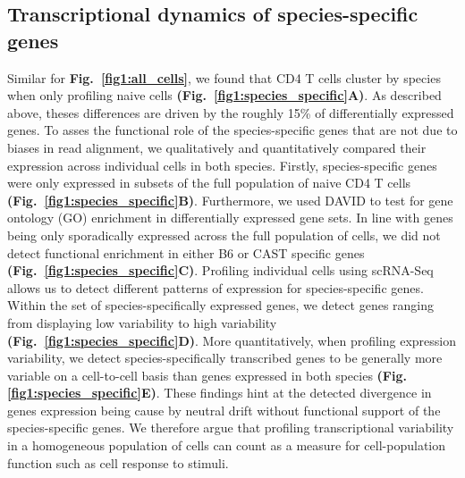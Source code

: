 \subsection{Transcriptional dynamics of species-specific genes}
\label{sec1:species-spec-dynamics}

Similar for \textbf{Fig.~\ref{fig1:all_cells}}, we found that CD4\plus{} T cells cluster by species when only profiling naive cells \textbf{(Fig.~\ref{fig1:species_specific}A)}. As described above, theses differences are driven by the roughly 15\% of differentially expressed genes. To asses the functional role of the species-specific genes that are not due to biases in read alignment, we qualitatively and quantitatively compared their expression across individual cells in both species. Firstly, species-specific genes were only expressed in subsets of the full population of naive CD4\plus{} T cells \textbf{(Fig.~\ref{fig1:species_specific}B)}. Furthermore, we used DAVID \citep{Dennis2003} to test for gene ontology (GO) enrichment in differentially expressed gene sets. In line with genes being only sporadically expressed across the full population of cells, we did not detect functional enrichment in either B6 or CAST specific genes \textbf{(Fig.~\ref{fig1:species_specific}C)}. Profiling individual cells using scRNA-Seq allows us to detect different patterns of expression for species-specific genes. Within the set of species-specifically expressed genes, we detect genes ranging from displaying low variability to high variability \textbf{(Fig.~\ref{fig1:species_specific}D)}. More quantitatively, when profiling expression variability, we detect species-specifically transcribed genes to be generally more variable on a cell-to-cell basis than genes expressed in both species \textbf{(Fig. \ref{fig1:species_specific}E)}. These findings hint at the detected divergence in genes expression being cause by neutral drift without functional support of the species-specific genes. We therefore argue that profiling transcriptional variability in a homogeneous population of cells can count as a measure for cell-population function such as cell response to stimuli.

\newpage

